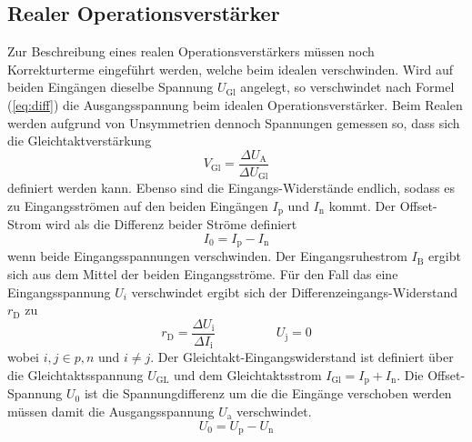\subsection{Realer Operationsverstärker}%
\label{sub:realer_operationsverstaerker}

Zur Beschreibung eines realen Operationsverstärkers müssen noch Korrekturterme
eingeführt werden, welche beim idealen verschwinden.
Wird auf beiden Eingängen dieselbe Spannung $U_\text{Gl}$ angelegt, so
verschwindet nach Formel (\ref{eq:diff}) die Ausgangsspannung beim idealen
Operationsverstärker.
Beim Realen werden aufgrund von Unsymmetrien dennoch Spannungen gemessen so, dass
sich die Gleichtaktverstärkung
\begin{equation}
		V_\text{Gl} = \frac{\Delta U_\text{A}}{\Delta U_\text{Gl}}
\end{equation}
definiert werden kann.
Ebenso sind die Eingangs-Widerstände endlich, sodass es zu Eingangsströmen auf
den beiden Eingängen $I_\text{p}$ und $I_\text{n}$ kommt.
Der Offset-Strom wird als die Differenz beider Ströme definiert
\begin{equation}
		I_0 = I_\text{p} - I_\text{n}
\end{equation}
wenn beide Eingangsspannungen verschwinden.
Der Eingangsruhestrom $I_\text{B}$ ergibt sich aus dem Mittel der beiden Eingangsströme.
Für den Fall das eine Eingangsspannung $U_{i}$ verschwindet ergibt sich der
Differenzeingangs-Widerstand $r_\text{D}$ zu
\begin{equation}
		r_\text{D} = \frac{\Delta U_\text{i}}{\Delta I_\text{i}} \hspace{2cm} U_\text{j} = 0
\end{equation}
wobei $i,j \in p,n$ und $i \neq j$.
Der Gleichtakt-Eingangswiderstand ist definiert über die Gleichtaktsspannung
$U_\text{GL}$ und dem Gleichtaktsstrom $I_\text{Gl} = I_\text{p} + I_\text{n}$.
Die Offset-Spannung $U_0$ ist die Spannungdifferenz um die die Eingänge
verschoben werden müssen damit die Ausgangsspannung $U_\text{a}$ verschwindet.
\begin{equation}
		U_0 = U_\text{p} - U_\text{n}
\end{equation}

